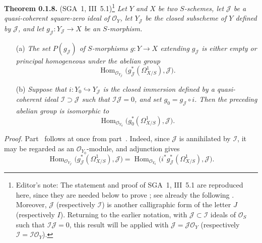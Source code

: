\medskip
\noindent{}\textbf{Theorem 0.1.8.} (SGA~1, III~5.1)\footnote{Editor's
note: The statement and proof of SGA~1, III~5.1 are reproduced here,
since they are needed below to prove ; see already the
following . Moreover, \(\mathscr J\) (respectively
\(\mathscr I\)) is another calligraphic form of the letter \(J\)
(respectively \(I\)). Returning to the earlier notation, with
\(\mathscr J\subset\mathscr I\) ideals of \(\mathscr O_S\) such that
\(\mathscr I\mathscr J=0\), this result will be applied with
\(\mathscr J=\mathscr J\mathscr O_Y\) (respectively
\(\mathscr I=\mathscr I\mathscr O_Y\)).}
\textit{Let \(Y\) and \(X\) be two \(S\)-schemes, let \(\mathscr J\)
be a quasi-coherent square-zero ideal of \(\mathscr O_Y\), let
\(Y_{\mathscr J}\) be the closed subscheme of \(Y\) defined by
\(\mathscr J\), and let \(g_{\mathscr J}:Y_{\mathscr J}\to X\) be an
\(S\)-morphism.}
\begin{enumerate}
\item[\SGAInlineRefTarget{sga3:iii:theorem:0-1-8:item:a}(a)] \textit{The set \(P(g_{\mathscr J})\) of \(S\)-morphisms
  \(g:Y\to X\) extending \(g_{\mathscr J}\) is either empty or
  principal homogeneous under the abelian group}
  \[
   \operatorname{Hom}_{\mathscr O_{Y_{\mathscr J}}}
   \bigl(g_{\mathscr J}^*(\Omega^1_{X/S}),\mathscr J\bigr).
  \]
\item[\SGAInlineRefTarget{sga3:iii:theorem:0-1-8:item:b}(b)] \textit{Suppose that \(i:Y_0\hookrightarrow Y_{\mathscr J}\)
  is the closed immersion defined by a quasi-coherent ideal
  \(\mathscr I\supset\mathscr J\) such that
  \(\mathscr I\mathscr J=0\), and set
  \(g_0=g_{\mathscr J}\circ i\). Then the preceding abelian group is
  isomorphic to}
  \[
   \operatorname{Hom}_{\mathscr O_{Y_0}}
   \bigl(g_0^*(\Omega^1_{X/S}),\mathscr J\bigr).
  \]
\end{enumerate}

\noindent\textit{Proof.}
Part~ follows at once from part~. Indeed, since \(\mathscr J\) is
annihilated by \(\mathscr I\), it may be regarded as an
\(\mathscr O_{Y_0}\)-module, and adjunction gives
\[
 \operatorname{Hom}_{\mathscr O_{Y_{\mathscr J}}}
  \bigl(g_{\mathscr J}^*(\Omega^1_{X/S}),\mathscr J\bigr)
 =
 \operatorname{Hom}_{\mathscr O_{Y_0}}
  \bigl(i^*g_{\mathscr J}^*(\Omega^1_{X/S}),\mathscr J\bigr).
\]

